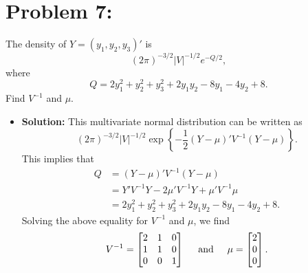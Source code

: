 \documentclass[11pt]{article}
\begin{document}
\section*{Problem 7:}
The density of $Y = (y_1,y_2,y_3)'$ is
\[
(2\pi)^{-3/2}|V|^{-1/2}e^{-Q/2},
\]
where
\[
Q = 2y_1^2 + y_2^2 + y_3^2 + 2y_1y_2 - 8y_1 - 4y_2 + 8.
\]
Find $V^{-1}$ and $\mu$.
\begin{itemize}
\item[] {\bf Solution:}  This multivariate normal distribution can be written as
\[
(2\pi)^{-3/2}|V|^{-1/2}\exp\left\{-\frac{1}{2}(Y-\mu)'V^{-1}(Y-\mu)\right\}.
\]
This implies that
\begin{align*}
Q &= (Y-\mu)'V^{-1}(Y-\mu) \\
&= Y'V^{-1}Y - 2\mu'V^{-1}Y + \mu'V^{-1}\mu \\
&= 2y_1^2 + y_2^2 + y_3^2 + 2y_1y_2 - 8y_1 - 4y_2 + 8.
\end{align*}
Solving the above equality for $V^{-1}$ and $\mu$, we find
\[
V^{-1} = \begin{bmatrix}
2 & 1 & 0 \\
1 & 1 & 0 \\
0 & 0 & 1
\end{bmatrix} \hspace{5mm}\text{and}\hspace{5mm} \mu = \begin{bmatrix}
2 \\ 0 \\ 0
\end{bmatrix}.
\]
\end{itemize}
\end{document}
